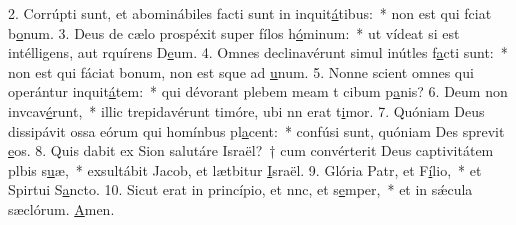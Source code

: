 2. Corrúpti sunt, et abominábiles facti sunt in inquit\uline{á}tibus:~* non est qui fciat b\uline{o}num.
3. Deus de cælo prospéxit super fílos h\uline{ó}minum:~* ut vídeat si est intélligens, aut rquírens D\uline{e}um.
4. Omnes declinavérunt simul inútles f\uline{a}cti sunt:~* non est qui fáciat bonum, non est sque ad \uline{u}num.
5. Nonne scient omnes qui operántur inquit\uline{á}tem:~* qui dévorant plebem meam t cibum p\uline{a}nis?
6. Deum non invcav\uline{é}runt,~* illic trepidavérunt timóre, ubi nn erat t\uline{i}mor.
7. Quóniam Deus dissipávit ossa eórum qui homínbus pl\uline{a}cent:~* confúsi sunt, quóniam Des sprevit \uline{e}os.
8. Quis dabit ex Sion salutáre Israël?~† cum convérterit Deus captivitátem plbis s\uline{u}æ,~* exsultábit Jacob, et lætbitur \uline{I}sraël.
9. Glória Patr, et F\uline{í}lio,~* et Spirtui S\uline{a}ncto.
10. Sicut erat in princípio, et nnc, et s\uline{e}mper,~* et in sǽcula sæclórum. \uline{A}men.

